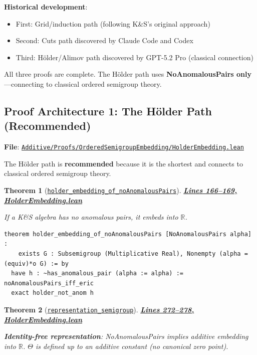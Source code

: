 \documentclass[11pt]{article}
\newtheorem{theorem}{Theorem}[section]
\theoremstyle{definition}
\theoremstyle{remark}
\begin{document}
\textbf{Historical development}:
\begin{itemize}
\item First: Grid/induction path (following K\&S's original approach)
\item Second: Cuts path discovered by Claude Code and Codex
\item Third: Hölder/Alimov path discovered by GPT-5.2 Pro (classical connection)
\end{itemize}

All three proofs are complete. The Hölder path uses \textbf{NoAnomalousPairs only}---connecting
to classical ordered semigroup theory.

\subsection{Proof Architecture 1: The Hölder Path (Recommended)}

\textbf{File}: \href{https://github.com/zariuq/ks-foundations-of-inference/blob/main/KnuthSkilling/Additive/Proofs/OrderedSemigroupEmbedding/HolderEmbedding.lean}{\texttt{Additive/Proofs/OrderedSemigroupEmbedding/HolderEmbedding.lean}}

The Hölder path is \textbf{recommended} because it is the shortest and connects to classical
ordered semigroup theory.

\begin{theorem}[\href{https://github.com/zariuq/ks-foundations-of-inference/blob/main/KnuthSkilling/Additive/Proofs/OrderedSemigroupEmbedding/HolderEmbedding.lean\#L166}{\texttt{holder\_embedding\_of\_noAnomalousPairs}}]
\textbf{\href{https://github.com/zariuq/ks-foundations-of-inference/blob/main/KnuthSkilling/Additive/Proofs/OrderedSemigroupEmbedding/HolderEmbedding.lean\#L166-L169}{Lines 166--169, HolderEmbedding.lean}}

If a K\&S algebra has no anomalous pairs, it embeds into $\mathbb{R}$.
\end{theorem}

\begin{lstlisting}[caption={Hölder embedding theorem}]
theorem holder_embedding_of_noAnomalousPairs [NoAnomalousPairs alpha] :
    exists G : Subsemigroup (Multiplicative Real), Nonempty (alpha =(equiv)*o G) := by
  have h : ~has_anomalous_pair (alpha := alpha) := noAnomalousPairs_iff_eric
  exact holder_not_anom h
\end{lstlisting}

\begin{theorem}[\href{https://github.com/zariuq/ks-foundations-of-inference/blob/main/KnuthSkilling/Additive/Proofs/OrderedSemigroupEmbedding/HolderEmbedding.lean\#L274}{\texttt{representation\_semigroup}}]
\textbf{\href{https://github.com/zariuq/ks-foundations-of-inference/blob/main/KnuthSkilling/Additive/Proofs/OrderedSemigroupEmbedding/HolderEmbedding.lean\#L272-L278}{Lines 272--278, HolderEmbedding.lean}}

\textbf{Identity-free representation}: NoAnomalousPairs implies additive embedding into $\mathbb{R}$.
$\Theta$ is defined up to an additive constant (no canonical zero point).
\end{theorem}
\end{document}
